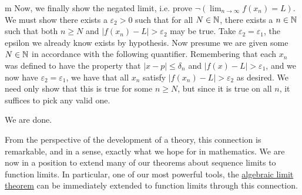 \documentclass[11pt]{article}
\begin{document}
\begin{my proof}{m}
Now, we finally show the negated limit, i.e. prove $\neg(\lim_{n \to \infty} f(x_n) = L)$. We must show there exists a $\varepsilon_2 > 0$ such that for all $N \in \mathbb{N}$, there exists a $n \in \mathbb{N}$ such that both $n \ge N$ and $|f(x_n) - L| > \varepsilon_2$ may be true. Take $\varepsilon_2 = \varepsilon_1$, the epsilon we already know exists by hypothesis. Now presume we are given some $N \in \mathbb{N}$ in accordance with the following  quantifier. Remembering that each $x_n$ was defined to have the property that $|x-p| \le \delta_n$ and $|f(x) - L| > \varepsilon_1$, and we now have $\varepsilon_2 = \varepsilon_1$, we have that all $x_n$ satisfy $|f(x_n) - L| > \varepsilon_2$ as desired. We need only show that this is true for some $n \ge N$, but since it is true on all $n$, it suffices to pick any valid one.

We are done.
\end{my proof}

From the perspective of the development of a theory, this connection is remarkable, and in a sense, exactly what we hope for in mathematics. We are now in a position to extend many of our theorems about sequence limits to function limits. In particular, one of our most powerful tools, the \hyperref[thm:AlgebraicLimitTheoremSequences]{algebraic limit theorem} can be immediately extended to function limits through this connection.
\end{document}
